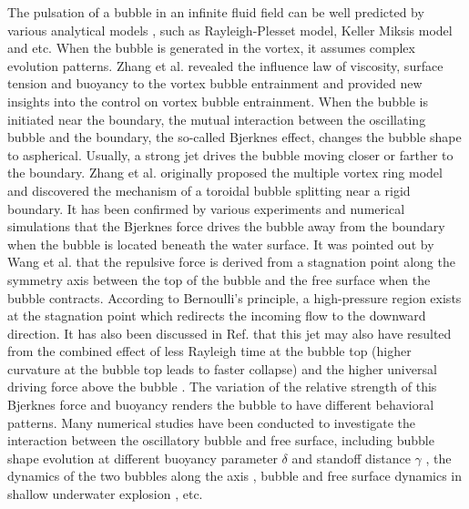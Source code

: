 \documentclass[%
 aip,
 amsmath,amssymb,
 reprint,%
]{revtex4-1}
\begin{document}
{ The pulsation of a bubble in an infinite fluid field can be well predicted by various analytical models \citep{RN2655,RN3014,RN2561}, such as Rayleigh-Plesset model\cite{RN2474}, Keller Miksis model\cite{RN2656} and etc. When the bubble is generated in the vortex, it assumes complex evolution patterns. Zhang et al.\citep{Chs} revealed the influence law of viscosity, surface tension and buoyancy to the vortex bubble entrainment and provided new insights into the control on vortex bubble entrainment. When the bubble is initiated near the boundary, the mutual interaction between the oscillating bubble and the boundary, the so-called Bjerknes effect, changes the bubble shape to aspherical\citep{RN20221,RN2991,RN2903,RN3017}. Usually, a strong jet\cite{RN2746} drives the bubble moving closer or farther to the boundary. Zhang et al.\cite{RN2797} originally proposed the multiple vortex ring model and discovered the mechanism of a toroidal bubble splitting near a rigid boundary. It has been confirmed by various experiments \citep{RN2827,RN2632,RN3030} and numerical simulations \citep{RN2828,RN2602,RN2634} that the Bjerknes force drives the bubble away from the boundary when the bubble is located beneath the water surface}. It was pointed out by Wang et al.\cite{RN2616} that the repulsive force is derived from a stagnation point along the symmetry axis between the top of the bubble and the free surface when the bubble contracts. According to Bernoulli's principle, a high-pressure region exists at the stagnation point which redirects the incoming flow to the downward direction. It has also been discussed in Ref.\cite{RN2607} that this jet may also have  resulted from the combined effect of less Rayleigh time at the bubble top (higher curvature at the bubble top leads to faster collapse) \citep{RN2856} and the higher universal driving force above the bubble \citep{RN2844}. The variation of the relative strength of this Bjerknes force and buoyancy renders the bubble to have different behavioral patterns. Many numerical studies have been conducted to investigate the interaction between the oscillatory bubble and free surface, including bubble shape evolution at different buoyancy parameter $\delta$ and standoff distance $\gamma$  \citep{RN2657,RN2616}, the dynamics of the two bubbles along the axis \citep{RN2602}, bubble and free surface dynamics in shallow underwater explosion \citep{RN31}, etc. 
\end{document}
